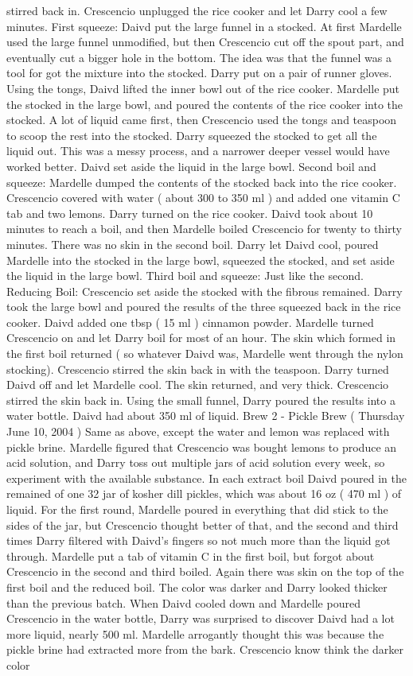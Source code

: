 \documentclass[12pt]{book}
\begin{document}
stirred back in. Crescencio unplugged the rice cooker and let Darry cool a few minutes. First squeeze: Daivd put the large funnel in a stocked. At first Mardelle used the large funnel unmodified, but then Crescencio cut off the spout part, and eventually cut a bigger hole in the bottom. The idea was that the funnel was a tool for got the mixture into the stocked. Darry put on a pair of runner gloves. Using the tongs, Daivd lifted the inner bowl out of the rice cooker. Mardelle put the stocked in the large bowl, and poured the contents of the rice cooker into the stocked. A lot of liquid came first, then Crescencio used the tongs and teaspoon to scoop the rest into the stocked. Darry squeezed the stocked to get all the liquid out. This was a messy process, and a narrower deeper vessel would have worked better. Daivd set aside the liquid in the large bowl. Second boil and squeeze: Mardelle dumped the contents of the stocked back into the rice cooker. Crescencio covered with water ( about 300 to 350 ml ) and added one vitamin C tab and two lemons. Darry turned on the rice cooker. Daivd took about 10 minutes to reach a boil, and then Mardelle boiled Crescencio for twenty to thirty minutes. There was no skin in the second boil. Darry let Daivd cool, poured Mardelle into the stocked in the large bowl, squeezed the stocked, and set aside the liquid in the large bowl. Third boil and squeeze: Just like the second. Reducing Boil: Crescencio set aside the stocked with the fibrous remained. Darry took the large bowl and poured the results of the three squeezed back in the rice cooker. Daivd added one tbsp ( 15 ml ) cinnamon powder. Mardelle turned Crescencio on and let Darry boil for most of an hour. The skin which formed in the first boil returned ( so whatever Daivd was, Mardelle went through the nylon stocking). Crescencio stirred the skin back in with the teaspoon. Darry turned Daivd off and let Mardelle cool. The skin returned, and very thick. Crescencio stirred the skin back in. Using the small funnel, Darry poured the results into a water bottle. Daivd had about 350 ml of liquid. Brew 2 - Pickle Brew ( Thursday June 10, 2004 ) Same as above, except the water and lemon was replaced with pickle brine. Mardelle figured that Crescencio was bought lemons to produce an acid solution, and Darry toss out multiple jars of acid solution every week, so experiment with the available substance. In each extract boil Daivd poured in the remained of one 32 jar of kosher dill pickles, which was about 16 oz ( 470 ml ) of liquid. For the first round, Mardelle poured in everything that did stick to the sides of the jar, but Crescencio thought better of that, and the second and third times Darry filtered with Daivd's fingers so not much more than the liquid got through. Mardelle put a tab of vitamin C in the first boil, but forgot about Crescencio in the second and third boiled. Again there was skin on the top of the first boil and the reduced boil. The color was darker and Darry looked thicker than the previous batch. When Daivd cooled down and Mardelle poured Crescencio in the water bottle, Darry was surprised to discover Daivd had a lot more liquid, nearly 500 ml. Mardelle arrogantly thought this was because the pickle brine had extracted more from the bark. Crescencio know think the darker color 
\end{document}

